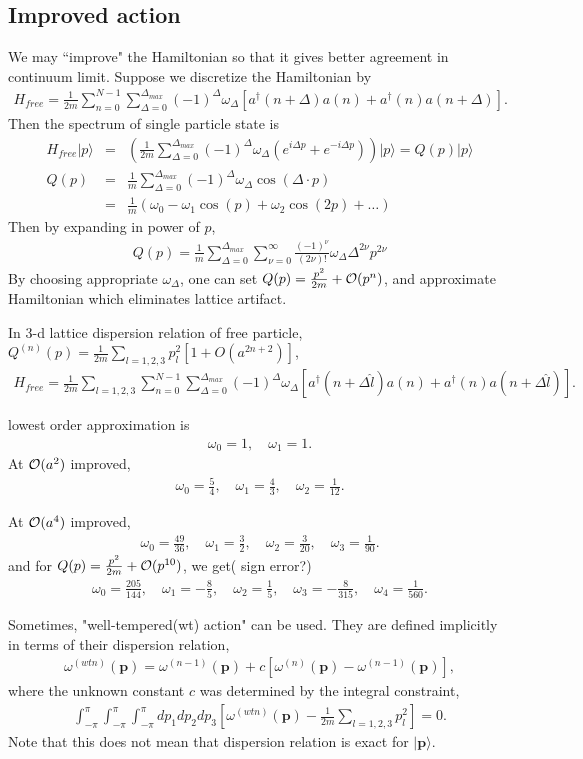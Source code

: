 \documentclass[10pt]{book}
\def\bm{\boldsymbol}
\newcommand{\bea}{\begin{eqnarray}}
\newcommand{\eea}{\end{eqnarray}}
\newcommand{\no}{\nonumber \\}
\def\vp{{\bm p}}
\def\ra{\rangle}
\begin{document}
\subsection{Improved action} 
We may ``improve" the Hamiltonian so that it gives better agreement in
continuum limit. 
Suppose we discretize the Hamiltonian by 
\bea 
\boxed{ 
H_{free}=\frac{1}{2m}\sum_{n=0}^{N-1}\sum_{\Delta=0}^{\Delta_{max}}
         (-1)^\Delta \omega_\Delta[a^\dagger(n+\Delta) a(n)+a^\dagger(n)a(n+\Delta)].}
\eea 
Then the spectrum of single particle state is
\bea
H_{free}|p\ra&=&\left( \frac{1}{2 m}\sum_{\Delta=0}^{\Delta_{max}} 
              (-1)^\Delta \omega_\Delta(e^{i\Delta p}+e^{-i\Delta p})\right) |p\ra 
             =Q(p)|p\ra  \no 
Q(p)&=&\frac{1}{m}\sum_{\Delta=0}^{\Delta_{max}}
             (-1)^\Delta \omega_\Delta\cos(\Delta\cdot p)\no 
    &=&\frac{1}{m}(\omega_0-\omega_1 \cos(p)+\omega_2 \cos(2p)+\dots )                     
\eea 
Then by expanding in power of $p$, 
\bea
Q(p)=\frac{1}{m} \sum_{\Delta=0}^{\Delta_{max}}\sum_{\nu=0}^\infty
    \frac{(-1)^\nu}{(2\nu)!}\omega_\Delta  \Delta^{2\nu}p^{2\nu} 
\eea 
By choosing appropriate $\omega_\Delta$, one can set $Q(p)=\frac{p^2}{2m}+{\cal O}(p^{n})$, 
and approximate Hamiltonian which eliminates lattice artifact.

In 3-d lattice dispersion relation of free particle,
$Q^{(n)}(p)=\frac{1}{2m}\sum_{l=1,2,3} p_l^2[1+O(a^{2n+2})]$, 
\bea 
\boxed{ 
	H_{free}=\frac{1}{2m}\sum_{l=1,2,3}\sum_{n=0}^{N-1}\sum_{\Delta=0}^{\Delta_{max}}
	(-1)^\Delta \omega_\Delta[a^\dagger(n+\Delta\hat{l}) a(n)+a^\dagger(n)a(n+\Delta\hat{l})].}
\eea 

lowest order approximation is 
\bea 
\omega_0=1,\quad  \omega_1=1.
\eea 
At ${\cal O}(a^2)$ improved,
\bea 
\omega_0=\frac{5}{4},\quad 
\omega_1=\frac{4}{3},\quad 
\omega_2=\frac{1}{12}.
\eea 

At ${\cal O}(a^4)$ improved,
\bea
\omega_0=\frac{49}{36},\quad 
\omega_1=\frac{3}{2},\quad 
\omega_2=\frac{3}{20},\quad 
\omega_3=\frac{1}{90}.
\eea 
and for $Q(p)=\frac{p^2}{2m}+{\cal O}(p^{10})$, we get({\color{red} sign error?})
\bea
\omega_0=\frac{205}{144},\quad \omega_1=-\frac{8}{5},\quad \omega_2=\frac{1}{5},
    \quad \omega_3=-\frac{8}{315},\quad \omega_4=\frac{1}{560}.
\eea 

Sometimes, "well-tempered(wt) action" can be used. They are defined implicitly 
in terms of their dispersion relation,
\bea 
\omega^{(wtn)}(\vp)=\omega^{(n-1)}(\vp)+c[\omega^{(n)}(\vp)-\omega^{(n-1)}(\vp)],
\eea 
where the unknown constant $c$ was determined by the integral constraint,
\bea 
\int_{-\pi}^{\pi}\int_{-\pi}^{\pi}\int_{-\pi}^{\pi} dp_1 dp_2 dp_3
\left[\omega^{(wtn)}(\vp)-\frac{1}{2m}\sum_{l=1,2,3} p_l^2 \right] =0.
\eea 
Note that this does not mean that dispersion relation is exact for $|{\bm p}\ra$.  
\end{document}
